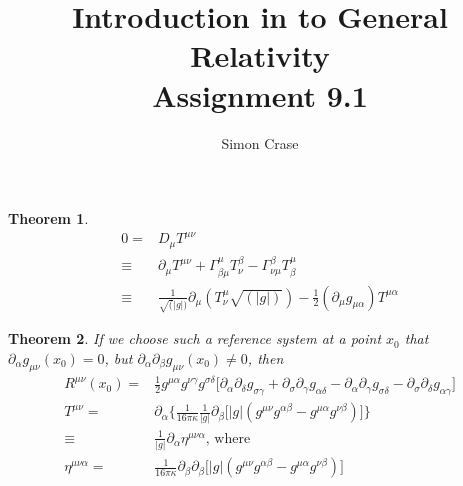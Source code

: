 \documentclass[]{article}
\title{Introduction in to General Relativity\\Assignment 9.1}
\author{Simon Crase}
\newtheorem{theorem}{Theorem}
\begin{document}
\maketitle


\begin{theorem}
	\begin{align*}
	0 =& D_{\mu} T^{\mu\nu} \\
	\equiv & \partial_{\mu} T^{\mu\nu} + \Gamma^{\mu}_{\beta\mu}T^{\beta}_{\nu}-\Gamma^{\beta}_{\nu\mu}T^{\mu}_{\beta}\\
	\equiv& \frac{1}{\sqrt(|g|)}\partial_{\mu}(T^{\mu}_{\nu}\sqrt{(|g|)}) - \frac{1}{2}(\partial_{\mu}g_{\mu\alpha})T^{\mu\alpha}
	\end{align*}
\end{theorem}

\begin{theorem}
	If we choose such a reference system at a point $x_0$ that $\partial_{\alpha}g_{\mu\nu}(x_0)=0$, but $\partial_{\alpha}\partial_{\beta}g_{\mu\nu}(x_0)\neq0$, then
	\begin{align*}
	R^{\mu\nu}(x_0) = & \frac{1}{2}g^{\mu\alpha}g^{\nu\gamma}g^{\sigma\delta}\big[\partial_{\alpha}\partial_{\delta}g_{\sigma\gamma} + \partial_{\sigma}\partial_{\gamma}g_{\alpha\delta} - \partial_{\alpha}\partial_{\gamma}g_{\sigma\delta} - \partial_{\sigma}\partial_{\delta}g_{\alpha\gamma}\big]\\
	T^{\mu\nu} =& \partial_{\alpha}\bigg\{ \frac{1}{16\pi\kappa}\frac{1}{|g|}\partial_{\beta}\big[|g|(g^{\mu\nu}g^{\alpha\beta}-g^{\mu\alpha}g^{\nu\beta})\big]\bigg\}\\
	\equiv& \frac{1}{|g|}\partial_{\alpha}\eta^{\mu\nu\alpha} \text{, where}\\
	\eta^{\mu\nu\alpha} =& \frac{1}{16\pi\kappa} \partial_{\beta} \partial_{\beta}\big[|g|(g^{\mu\nu}g^{\alpha\beta}-g^{\mu\alpha}g^{\nu\beta})\big]
	\end{align*}
\end{theorem}
\end{document}
